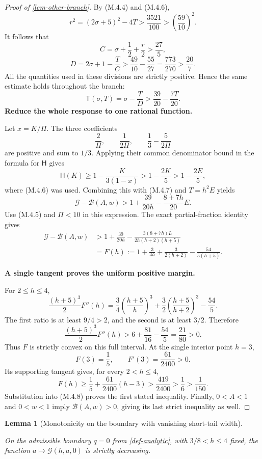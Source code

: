 \documentclass[11pt,a4paper]{article}
\theoremstyle{proofmanuscript}
\newtheorem{lemma}[theorem]{Lemma}
\begin{document}
\begin{proof}[Proof of \ref{lem-other-branch}]
By (M.4.4) and (M.4.6), \[
r^2=(2\sigma+5)^2-4T
>\frac{3521}{100}>\left(\frac{59}{10}\right)^2.
\] It follows that \[
C=\sigma+\frac12+\frac r2>\frac{27}{5},
\] \[
D=2\sigma+1-\frac TC
>\frac{49}{10}-\frac{55}{27}
=\frac{773}{270}>\frac{20}{7}.
\] All the quantities used in these divisions are strictly positive. Hence the same estimate holds throughout the branch: \[
\mathsf T(\sigma,T)=\sigma-\frac TD
>\frac{39}{20}-\frac{7T}{20}.
\tag{M.4.7}
\] \textbf{Reduce the whole response to one rational function.}

Let \(x=K/\Pi\). The three coefficients \[
\frac2\Pi,\qquad \frac1{2\Pi},\qquad
\frac13-\frac5{2\Pi}
\] are positive and sum to \(1/3\). Applying their common denominator bound in the formula for \(\mathsf H\) gives \[
\mathsf H(K)\ge1-\frac{K}{3(1-x)}
>1-\frac{2K}{5}>1-\frac{2E}{5},
\] where (M.4.6) was used. Combining this with (M.4.7) and \(T=h^2E\) yields \[
\mathcal G-\mathcal B(A,w)
>1+\frac{39}{20h}-\frac{8+7h}{20}E.
\] Use (M.4.5) and \(\Pi<10\) in this expression. The exact partial-fraction identity gives \[
\begin{aligned}
\mathcal G-\mathcal B(A,w)
&>1+\frac{39}{20h}
-\frac{3(8+7h)L}{2h(h+2)(h+5)}\\
&=F(h):=1+\frac3{4h}+\frac3{2(h+2)}-\frac{54}{5(h+5)}.
\end{aligned}
\tag{M.4.8}
\]

\textbf{A single tangent proves the uniform positive margin.}

For \(2\le h\le4\), \[
\frac{(h+5)^3}{2}F''(h)
=\frac34\left(\frac{h+5}{h}\right)^3
+\frac32\left(\frac{h+5}{h+2}\right)^3-\frac{54}{5}.
\] The first ratio is at least \(9/4>2\), and the second is at least \(3/2\). Therefore \[
\frac{(h+5)^3}{2}F''(h)
>6+\frac{81}{16}-\frac{54}{5}
=\frac{21}{80}>0.
\] Thus \(F\) is strictly convex on this full interval. At the single interior point \(h=3\), \[
F(3)=\frac15,\qquad F'(3)=\frac{61}{2400}>0.
\] Its supporting tangent gives, for every \(2<h\le4\), \[
F(h)\ge\frac15+\frac{61}{2400}(h-3)
>\frac{419}{2400}>\frac16>\frac1{150}.
\] Substitution into (M.4.8) proves the first stated inequality. Finally, \(0<A<1\) and \(0<w<1\) imply \(\mathcal B(A,w)>0\), giving its last strict inequality as well.

\end{proof}

\begin{lemma}[Monotonicity on the boundary with vanishing short-tail width]\label{lem-zero-monotone}

On the admissible boundary \(q=0\) from \ref{def-analytic}, with \(3/8<h\le4\) fixed, the function \(a\mapsto\mathcal G(h,a,0)\) is strictly decreasing.

\end{lemma}
\end{document}
